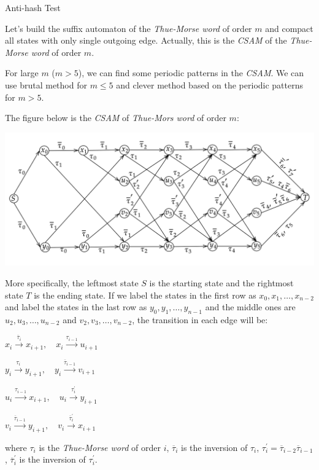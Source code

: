 \begin{tutorial}{Anti-hash Test}

Let's build the suffix automaton of the \textit{Thue-Morse word} of order $m$ and compact all states with only single outgoing edge. Actually, this is the \textit{CSAM} of the \textit{Thue-Morse word} of order $m$.

For large $m$ ($m > 5$), we can find some periodic patterns in the \textit{CSAM}. We can use brutal method for $m \le 5$ and clever method based on the periodic patterns for $m > 5$.

The figure below is the \textit{CSAM} of \textit{Thue-Mors word} of order $m$:

\includegraphics[natwidth=1404,natheight=604,scale=0.3]{t7.png}

More specifically, the leftmost state $S$ is the starting state and the rightmost state $T$ is the ending state. If we label the states in the first row as $x_0,x_1,\ldots,x_{n-2}$ and label the states in the last row as $y_0,y_1,\ldots,y_{n-1}$ and the middle ones are $u_2,u_3,\ldots,u_{n-2}$ and $v_2,v_3,\ldots,v_{n-2}$, the transition in each edge will be:

$x_i \overset{\overline{\tau}_{i}}{\longrightarrow} x_{i+1}, \quad x_i \overset{\tau_{i-1}}{\longrightarrow} u_{i+1}$

$y_i \overset{\tau_{i}}{\longrightarrow} y_{i+1}, \quad y_i \overset{\overline{\tau}_{i-1}}{\longrightarrow} v_{i+1}$

$u_i \overset{\tau_{i-1}}{\longrightarrow} x_{i+1}, \quad u_i \overset{\tau^\prime_{i}}{\longrightarrow} y_{i+1}$

$v_i \overset{\overline{\tau}_{i-1}}{\longrightarrow} y_{i+1}, \quad v_i \overset{\overline{\tau}^\prime_{i}}{\longrightarrow} x_{i+1}$

where $\tau_i$ is the \textit{Thue-Morse word} of order $i$, $\overline{\tau}_i$ is the inversion of $\tau_i$, $\tau^\prime_i=\overline{\tau}_{i-2}\overline{\tau}_{i-1}$, $\overline{\tau}^\prime_i$ is the inversion of $\tau^\prime_i$.


\end{tutorial}
